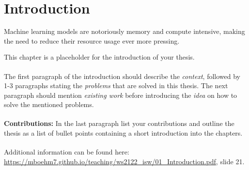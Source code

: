 \chapter{Introduction\label{cha:chapter1}}

Machine learning models are notoriously memory and compute intensive, 
making the need to reduce their resource usage ever more pressing.


This chapter is a placeholder for the introduction of your thesis. 
\\
\\
\noindent
The first paragraph of the introduction should describe the \emph{context}, followed by 1-3 paragraphs stating the \emph{problems} that are solved in this thesis.
The next paragraph should mention \emph{existing work} before introducing the \emph{idea} on how to solve the mentioned problems.\\
\\
\textbf{Contributions:}
In the last paragraph list your contributions and outline the thesis as a list of bullet points containing a short introduction into the chapters. 
\\
\\
\noindent 
Additional information can be found here: \url{https://mboehm7.github.io/teaching/ws2122_isw/01_Introduction.pdf}, slide 21.
